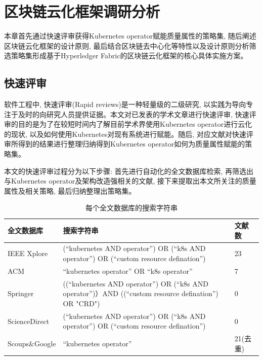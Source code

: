 \chapter{区块链云化框架调研分析}

本章首先通过快速评审获得Kubernetes operator赋能质量属性的策略集,  随后阐述区块链云化框架的设计原则, 最后结合区块链去中心化等特性以及设计原则分析筛选策略集形成基于Hyperledger Fabric的区块链云化框架的核心具体实施方案。

\section{快速评审}\label{section: rapid_reviews}

软件工程中, 快速评审(Rapid reviews)是一种轻量级的二级研究, 以实践为导向专注于及时的向研究人员提供证据\cite{cartaxo2020rapid}。本文对已发表的学术文章进行快速评审, 快速评审的目的是为了在较短时间内了解目前学术界使用Kubernetes operator进行云化的现状, 以及如何使用Kubernetes对现有系统进行赋能。随后, 对应文献对快速评审所得到的结果进行整理归纳得到Kubernetes operator如何为质量属性赋能的策略集。

本文的快速评审过程分为以下步骤: 首先进行自动化的全文数据库检索, 再筛选出与Kubernetes operator及架构改造强相关的文献, 接下来提取出本文所关注的质量属性及相关策略, 最后归纳整理出策略集。

{\footnotesize
\begin{longtable}[h]{m{60pt} m{210pt} m{40pt}<{\centering}}
    \caption[每个全文数据库的搜索字符串]{每个全文数据库的搜索字符串} \label{search_string} \\
        \toprule  
        \textbf{全文数据库}&\textbf{搜索字符串}&\textbf{文献数}\\
        \hline
        IEEE Xplore &(“kubernetes AND operator”) OR (“k8s AND operator”) OR (“custom resource defination”) & 23 \\

        ACM & “kubernetes operator” OR “k8s operator” & 7 \\

        Springer &((“kubernetes AND operator”) OR (“k8s AND operator”)）AND ((“custom resource defination”) OR "CRD") & 0 \\

        ScienceDirect &(“kubernetes AND operator”) OR (“k8s AND operator”) OR (“custom resource defination”) & 0 \\
        \hline
        Scoups\&Google &“kubernetes operator”& 21(去重) \\
        \bottomrule
    \end{longtable}
}

